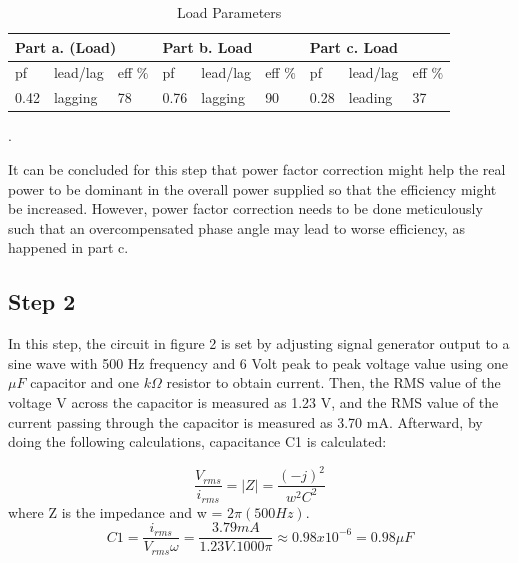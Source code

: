 \documentclass[letterpaper,12pt]{article}
\begin{document}
\begin{table}[H]
  \begin{center}
    \caption{Load Parameters}
    \vspace{2mm}
 \begin{tabular}{||lll|lll|lll||}
    \hline
    \multicolumn{3}{|l|}{Part a. (Load)}                            & \multicolumn{3}{l|}{Part b. Load}                            & \multicolumn{3}{l|}{Part c. Load}                            \\ \hline
    \multicolumn{1}{|l|}{pf} & \multicolumn{1}{l|}{lead/lag} & eff \(\%\) & \multicolumn{1}{l|}{pf} & \multicolumn{1}{l|}{lead/lag} &eff \(\%\)  & \multicolumn{1}{l|}{pf} & \multicolumn{1}{l|}{lead/lag} &eff \(\%\)  \\ \hline
    \multicolumn{1}{|l|}{0.42} & \multicolumn{1}{l|}{lagging} & 78 & \multicolumn{1}{l|}{0.76} & \multicolumn{1}{l|}{lagging} & 90 & \multicolumn{1}{l|}{0.28} & \multicolumn{1}{l|}{leading} & 37 \\ \hline
    \end{tabular}.
\end{center}

\end{table}

It can be concluded for this step that power factor correction might help the real power to be dominant in the overall power supplied so that the efficiency might be increased. However, power factor correction needs to be done meticulously such that an overcompensated phase angle may lead to worse efficiency, as happened in part c.


\subsection{Step 2}

In this step, the circuit in figure 2 is set by adjusting signal generator output to a sine wave with 500 Hz frequency and 6 Volt peak to peak voltage value using one \(\mu F\) capacitor and one \(k\Omega \) resistor to obtain current. Then, the RMS value of the voltage V across the capacitor is measured as 1.23 V, and the RMS value of the current passing through the capacitor is measured as 3.70 mA. Afterward, by doing the following calculations, capacitance C1 is calculated:

\[\frac{V_{rms}}{i_{rms}} = |Z| = \frac{(-j)^2}{w^2C^2}\]
where Z is the impedance and w = \(2\pi (500 Hz)\).  
\[C1 = \frac{i_{rms}}{V_{rms}\omega}  =  \frac{3.79 mA}{1.23 V . 1000\pi} \approx 0.98x10^{-6} = 0.98 \mu F\]
\end{document}
